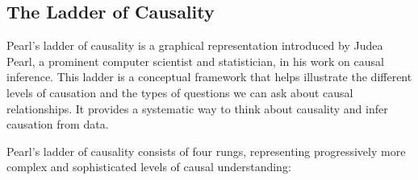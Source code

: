 \documentclass{tufte-handout}
\begin{document}
\subsection{The Ladder of Causality}

Pearl's ladder of causality is a graphical representation introduced by Judea Pearl, a prominent computer scientist and statistician, in his work on causal inference. This ladder is a conceptual framework that helps illustrate the different levels of causation and the types of questions we can ask about causal relationships. It provides a systematic way to think about causality and infer causation from data.

Pearl's ladder of causality consists of four rungs, representing progressively more complex and sophisticated levels of causal understanding:
\end{document}
